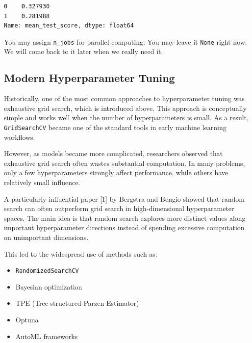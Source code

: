 \documentclass[
  letterpaper,
  DIV=11,
  numbers=noendperiod]{scrreprt}
\providecommand{\tightlist}{%
  \setlength{\itemsep}{0pt}\setlength{\parskip}{0pt}}
\theoremstyle{definition}
\theoremstyle{definition}
\theoremstyle{plain}
\theoremstyle{plain}
\theoremstyle{remark}
\begin{document}
\begin{verbatim}
0    0.327930
1    0.281988
Name: mean_test_score, dtype: float64
\end{verbatim}

\begin{tcolorbox}[enhanced jigsaw, arc=.35mm, bottomrule=.15mm, bottomtitle=1mm, breakable, colback=white, colbacktitle=quarto-callout-note-color!10!white, colframe=quarto-callout-note-color-frame, coltitle=black, left=2mm, leftrule=.75mm, opacityback=0, opacitybacktitle=0.6, rightrule=.15mm, title=\textcolor{quarto-callout-note-color}{\faInfo}\hspace{0.5em}{\texttt{n\_jobs}}, titlerule=0mm, toprule=.15mm, toptitle=1mm]

You may assign \texttt{n\_jobs} for parallel computing. You may leave it
\texttt{None} right now. We will come back to it later when we really
need it.

\end{tcolorbox}

\subsection{Modern Hyperparameter
Tuning}\label{modern-hyperparameter-tuning}

Historically, one of the most common approaches to hyperparameter tuning
was exhaustive grid search, which is introduced above. This approach is
conceptually simple and works well when the number of hyperparameters is
small. As a result, \texttt{GridSearchCV} became one of the standard
tools in early machine learning workflows.

However, as models became more complicated, researchers observed that
exhaustive grid search often wastes substantial computation. In many
problems, only a few hyperparameters strongly affect performance, while
others have relatively small influence.

A particularly influential paper {[}1{]} by Bergstra and Bengio showed
that random search can often outperform grid search in high-dimensional
hyperparameter spaces. The main idea is that random search explores more
distinct values along important hyperparameter directions instead of
spending excessive computation on unimportant dimensions.

This led to the widespread use of methods such as:

\begin{itemize}
\tightlist
\item
  \texttt{RandomizedSearchCV}
\item
  Bayesian optimization
\item
  TPE (Tree-structured Parzen Estimator)
\item
  Optuna
\item
  AutoML frameworks
\end{itemize}
\end{document}
